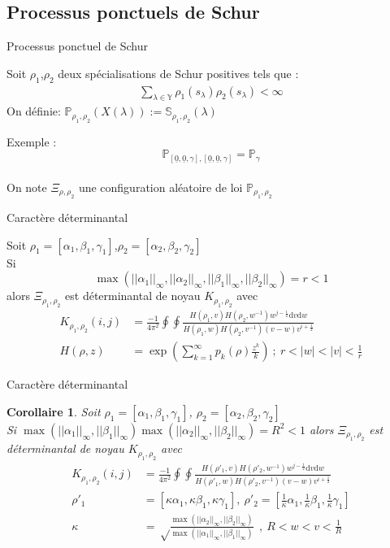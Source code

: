 \documentclass[french]{beamer}
\newtheorem{corollaire}[theorem]{Corollaire}
\begin{document}
\subsection{Processus ponctuels de Schur}
\begin{frame}{Processus ponctuel de Schur}
\begin{definition} 
Soit $\rho_1$,$\rho_2$  deux spécialisations de Schur positives tels que : 
\begin{align*}
\sum_{\lambda \in \mathbb{Y}} \rho_1(s_\lambda
)\rho_2(s_\lambda) <\infty \end{align*}
On définie:
$\mathbb{P}_{\rho_1,\rho_2}(X(\lambda)):=\mathbb{S}_{\rho_1,\rho_2}(\lambda)$
\end{definition}
Exemple :  $$\mathbb{P}_{[\underline{0},\underline{0},\gamma],[\underline{0},\underline{0},\gamma]}=\mathbb{P}_\gamma$$
\\ On note  $\Xi_{\rho,\rho_2}$ une configuration aléatoire de loi $\mathbb{P}_{\rho_1,\rho_2}$
\end{frame}
\begin{frame}{Caractère déterminantal} 
\begin{theorem}
Soit $\rho_1=[\alpha_1,\beta_1,\gamma_1]$,$\rho_2=[\alpha_2,\beta_2,\gamma_2]$\\ Si $$\max(||\alpha_1||_\infty,||\alpha_2||_\infty,||\beta_1||_\infty,||\beta_2||_\infty)=r<1$$ alors 
$\Xi_{\rho_1,\rho_2}$ est déterminantal de noyau $K_{\rho_1,\rho_2}$
avec 
\begin{align*} 
K_{\rho_1,\rho_2}(i,j)&=\frac{-1}{4\pi^2} \oint\oint \frac{H(\rho_1,v)H(\rho_2,w^{-1})w^{j- \frac 1 2 }\mathrm{d}v \mathrm{d}w}{H(\rho_1,w)H(\rho_2,v^{-1})(v-w)v^{i+\frac 1 2}}
\\H(\rho,z)&= \exp\left(\sum_{k=1}^\infty p_k(\rho)\frac{z^k}{k}\right) \ ; \  r<|w|<|v|<\frac{1}{r}
\label{H}
\end{align*}
\end{theorem}
\end{frame}
\begin{frame}{Caractère déterminantal}
\begin{corollaire}
Soit $\rho_1=[\alpha_1,\beta_1,\gamma_1]$,  $\rho_2=[\alpha_2,\beta_2,\gamma_2]$\\ Si $\max(||\alpha_1||_\infty,||\beta_1||_\infty)\max(||\alpha_2||_\infty,||\beta_2||_\infty)=R^2<1$ alors 
$\Xi_{\rho_1,\rho_2}$ est déterminantal de noyau $K_{\rho_1,\rho_2}$
avec 
\begin{align*} 
K_{\rho_1,\rho_2}(i,j)&=\frac{-1}{4\pi^2} \oint\oint \frac{H(\rho'_1,v)H(\rho'_2,w^{-1})w^{j- \frac 1 2 }\mathrm{d}v \mathrm{d}w}{H(\rho'_1,w)H(\rho'_2,v^{-1})(v-w)v^{i+\frac 1 2}}
\\ \rho'_1&=[\kappa \alpha_1,\kappa \beta_1,\kappa \gamma_1] , \  \rho'_2=[\frac{1}{\kappa} \alpha_1,\frac{1}{\kappa} \beta_1,\frac{1}{\kappa} \gamma_1] \\
\kappa &=\sqrt \frac{\max(||\alpha_2||_\infty,||\beta_2||_\infty)}{\max(||\alpha_1||_\infty,||\beta_1||_\infty)}\  \ , \ R<w<v<\frac{1}{R}
\end{align*}

\end{corollaire}
\end{frame}
\end{document}
